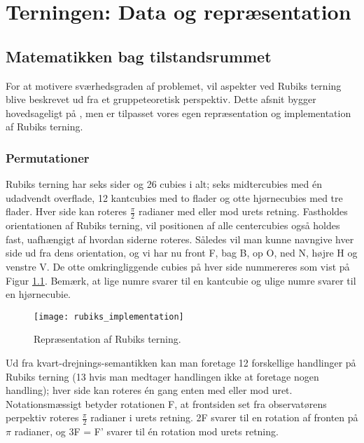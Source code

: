 \documentclass[../main.tex]{subfiles}
\begin{document}
\chapter{Terningen: Data og repræsentation}\label{chp:data}
\section{Matematikken bag tilstandsrummet}\label{sec:grouptheory}
For at motivere sværhedsgraden af problemet, vil aspekter ved Rubiks terning blive beskrevet ud fra et gruppeteoretisk perspektiv.
Dette afsnit bygger hovedsageligt på \cite{GroupTheory}, men er tilpasset vores egen repræsentation og implementation af Rubiks terning. 
\subsection*{Permutationer}

Rubiks terning har seks sider og 26 cubies i alt; seks midtercubies med én udadvendt overflade, 12 kantcubies med to flader og otte hjørnecubies med tre flader.
Hver side kan roteres $\frac{\pi}{2}$ radianer med eller mod urets retning. Fastholdes orientationen af Rubiks terning, vil positionen af alle centercubies også holdes fast, uafhængigt af hvordan siderne roteres.
Således vil man kunne navngive hver side ud fra dens orientation, og vi har nu front F, bag B, op O, ned N, højre H og venstre V.
De otte omkringliggende cubies på hver side nummereres som vist på Figur \ref{RubiksImplementation}.
Bemærk, at lige numre svarer til en kantcubie og ulige numre svarer til en hjørnecubie.

\begin{figure}[H]
	\centering 
	\texttt{[image: rubiks\_implementation]}
	\caption{Repræsentation af Rubiks terning.}
	\label{RubiksImplementation}
\end{figure}
Ud fra kvart-drejnings-semantikken kan man foretage 12 forskellige handlinger på Rubiks terning (13 hvis man medtager handlingen ikke at foretage nogen handling);
hver side kan roteres én gang enten med eller mod uret.
Notationsmæssigt betyder rotationen F, at frontsiden set fra observatørens perpektiv roteres $\frac{\pi}{2}$ radianer i urets retning.
2F svarer til en rotation af fronten på $\pi$ radianer, og 3F = F' svarer til én rotation mod urets retning.
\end{document}
